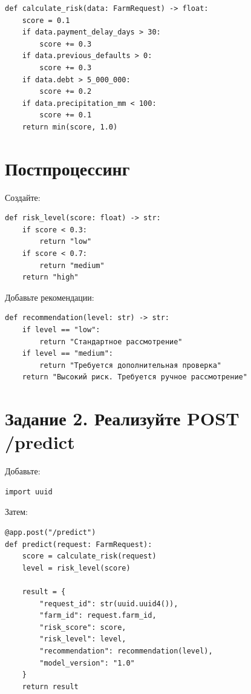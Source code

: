 \documentclass[12pt,a4paper]{article}
\begin{document}
\begin{lstlisting}[caption={Функция расчёта риска}]
def calculate_risk(data: FarmRequest) -> float:
    score = 0.1
    if data.payment_delay_days > 30:
        score += 0.3
    if data.previous_defaults > 0:
        score += 0.3
    if data.debt > 5_000_000:
        score += 0.2
    if data.precipitation_mm < 100:
        score += 0.1
    return min(score, 1.0)
\end{lstlisting}

\section{Постпроцессинг}

Создайте:

\begin{lstlisting}[caption={Функция risk\_level}]
def risk_level(score: float) -> str:
    if score < 0.3:
        return "low"
    if score < 0.7:
        return "medium"
    return "high"
\end{lstlisting}

Добавьте рекомендации:

\begin{lstlisting}[caption={Функция recommendation}]
def recommendation(level: str) -> str:
    if level == "low":
        return "Стандартное рассмотрение"
    if level == "medium":
        return "Требуется дополнительная проверка"
    return "Высокий риск. Требуется ручное рассмотрение"
\end{lstlisting}

\section{Задание 2. Реализуйте POST /predict}

Добавьте:

\begin{lstlisting}[caption={Импорт uuid}]
import uuid
\end{lstlisting}

Затем:

\begin{lstlisting}[caption={Endpoint /predict}]
@app.post("/predict")
def predict(request: FarmRequest):
    score = calculate_risk(request)
    level = risk_level(score)

    result = {
        "request_id": str(uuid.uuid4()),
        "farm_id": request.farm_id,
        "risk_score": score,
        "risk_level": level,
        "recommendation": recommendation(level),
        "model_version": "1.0"
    }
    return result
\end{lstlisting}
\end{document}
